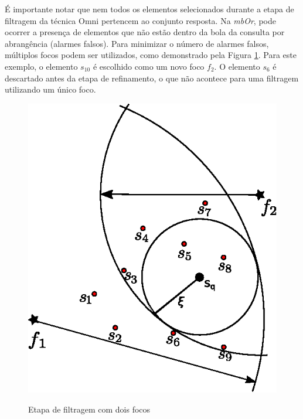 É importante notar que nem todos os elementos selecionados durante a etapa de filtragem da técnica Omni pertencem ao conjunto resposta. Na \textit{mbOr}, pode ocorrer a presença
de elementos que não estão dentro da bola da consulta por abrangência (alarmes falsos). Para minimizar o número de alarmes falsos, múltiplos focos podem ser utilizados, como demonstrado pela Figura \ref{fig:rgex3}.
Para este exemplo, o elemento $s_{10}$ é escolhido como um novo foco $f_2$. O elemento $s_6$ é descartado antes da etapa de refinamento, o que não acontece para uma filtragem utilizando um único foco.

\begin{figure}[H]
\centering
\caption{Etapa de filtragem com dois focos}
\includegraphics[width=.55\textwidth]{dados/figuras/rg_ex3.eps}
\label{fig:rgex3}
\end{figure}


